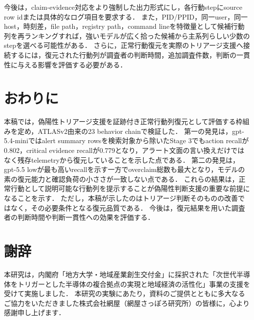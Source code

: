 \documentclass[a4paper,twocolumn,10pt]{article}
\newcommand{\code}[1]{{\small\ttfamily #1}}
\begin{document}
今後は，claim-evidence対応をより強制した出力形式にし，各行動stepにsource row idまたは具体的なログ項目を要求する．
また，PID/PPID，同一user，同一host，時刻差，file path，registry path，command lineを特徴量として候補行動列を再ランキングすれば，強いモデルが広く拾った候補から主系列らしい少数のstepを選べる可能性がある．
さらに，正常行動復元を実際のトリアージ支援へ接続するには，復元された行動列が調査者の判断時間，追加調査件数，判断の一貫性に与える影響を評価する必要がある．

\section{おわりに}

本稿では，偽陽性トリアージ支援を証跡付き正常行動列復元として評価する枠組みを定め，ATLASv2由来の23 behavior chain\cite{atlasv2}で検証した．
第一の発見は，\code{gpt-5.4-mini}ではalert summary rowsを検索対象から除いたStage 3でもaction recallが0.802，critical evidence recallが0.779となり，アラート文面の言い換えだけではなく残存telemetryから復元していることを示した点である．
第二の発見は，\code{gpt-5.5 low}が最も高いrecallを示す一方でoverclaim総数も最大となり，モデルの素の復元能力と確認負荷の小ささが一致しない点である．
これらの結果は，正常行動として説明可能な行動列を提示することが偽陽性判断支援の重要な前提になることを示す．
ただし，本稿が示したのはトリアージ判断そのものの改善ではなく，その必要条件となる復元品質である．
今後は，復元結果を用いた調査者の判断時間や判断一貫性への効果を評価する．

\section*{謝辞}

本研究は，内閣府「地方大学・地域産業創生交付金」に採択された「次世代半導体をトリガーとした半導体の複合拠点の実現と地域経済の活性化」事業の支援を受けて実施しました．
本研究の実験にあたり，資料のご提供とともに多大なるご協力をいただきました株式会社網屋（網屋さっぽろ研究所）の皆様に，心より感謝申し上げます．
\end{document}
